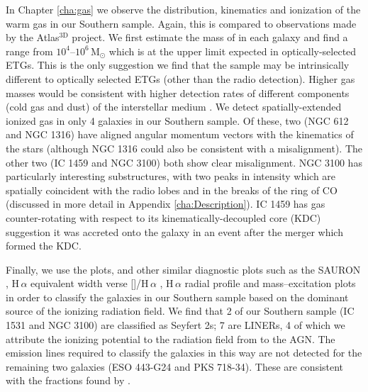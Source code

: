 In Chapter \ref{cha:gas} we observe the distribution, kinematics and ionization of the warm gas in our Southern sample. Again, this is compared to observations made by the Atlas$^\text{3D}$ project. We first estimate the mass of  in each galaxy and find a range from $10^4$--$10^6\,\mathrm{M_\odot}$ which is at the upper limit expected in optically-selected ETGs. This is the only suggestion we find that the sample may be intrinsically different to optically selected ETGs (other than the radio detection). Higher gas masses would be consistent with higher detection rates of different components (cold gas and dust) of the interstellar medium \citep[ISM; e.g.][]{DeRuiter2002, Leon2003, VerdoesKleijn2005}. We detect spatially-extended ionized gas in only 4 galaxies in our Southern sample. Of these, two (NGC 612 and NGC 1316) have aligned angular momentum vectors with the kinematics of the stars (although NGC 1316 could also be consistent with a misalignment). The other two (IC 1459 and NGC 3100) both show clear misalignment. NGC 3100 has particularly interesting substructures, with two peaks in intensity which are spatially coincident with the radio lobes and in the breaks of the ring of CO (discussed in more detail in Appendix \ref{cha:Description}). IC 1459 has gas counter-rotating with respect to its kinematically-decoupled core (KDC) suggestion it was accreted onto the galaxy in an event after the merger which formed the KDC. 

Finally, we use the \citet[; BPT]{Baldwin1981} plots, and other similar diagnostic plots such as the SAURON \citep{Sarzi2010}, H\,$\alpha$ equivalent width verse []/H\,$\alpha$ \citep[WHaN2;][]{CidFernandes2011}, H\,$\alpha$ radial profile and mass--excitation \citep[MEx;][]{Nyland2016} plots in order to classify the galaxies in our Southern sample based on the dominant source of the ionizing radiation field. We find that 2 of our Southern sample (IC 1531 and NGC 3100) are classified as Seyfert 2s; 7 are LINERs, 4 of which we attribute the ionizing potential to the radiation field from to the AGN. The emission lines required to classify the galaxies in this way are not detected for the remaining two galaxies (ESO 443-G24 and PKS 718-34). These are consistent with the fractions found by \citet{Nyland2016}.

